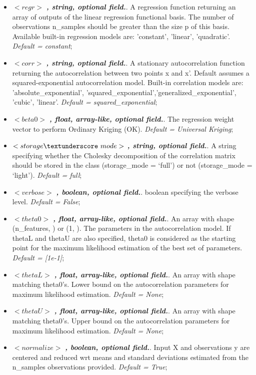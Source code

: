 \begin{itemize}
\item $<regr>$ \textbf{\textit{, string, optional field.}}.  A regression function returning an array of outputs of the linear regression functional basis. The number of observations n\_samples should be greater than the size p of this basis. Available built-in regression models are:
'constant', 'linear', 'quadratic'. \textit{Default = constant};
\item $<corr>$ \textbf{\textit{, string, optional field.}}. A stationary autocorrelation function returning the autocorrelation between two points x and x’. Default assumes a squared-exponential autocorrelation model. Built-in correlation models are:
'absolute\_exponential', 'squared\_exponential','generalized\_exponential', 'cubic', 'linear'. \textit{Default = squared\_exponential};
\item $<beta0>$ \textbf{\textit{, float, array-like, optional field.}}. The regression weight vector to perform Ordinary Kriging (OK). \textit{Default = Universal Kriging};
\item $<storage\textunderscore~mode>$ \textbf{\textit{, string, optional field.}}. A string specifying whether the Cholesky decomposition of the correlation matrix should be stored in the class (storage\_mode = ‘full’) or not (storage\_mode = ‘light’). \textit{Default = full};
\item $<verbose>$ \textbf{\textit{, boolean, optional field.}}.  boolean specifying the verbose level. \textit{Default = False};
\item $<theta0>$ \textbf{\textit{, float, array-like, optional field.}}.  An array with shape (n\_features, ) or (1, ). The parameters in the autocorrelation model. If thetaL and thetaU are also specified, theta0 is considered as the starting point for the maximum likelihood estimation of the best set of parameters. \textit{Default = [1e-1]};
\item $<thetaL>$ \textbf{\textit{, float, array-like, optional field.}}. An array with shape matching theta0’s. Lower bound on the autocorrelation parameters for maximum likelihood estimation. \textit{Default = None};
\item $<thetaU>$ \textbf{\textit{, float, array-like, optional field.}}. An array with shape matching theta0’s. Upper bound on the autocorrelation parameters for maximum likelihood estimation. \textit{Default = None};
\item $<normalize>$ \textbf{\textit{, boolean, optional field.}}.  Input X and observations y are centered and reduced wrt means and standard deviations estimated from the n\_samples observations provided. \textit{Default = True};

\end{itemize}
